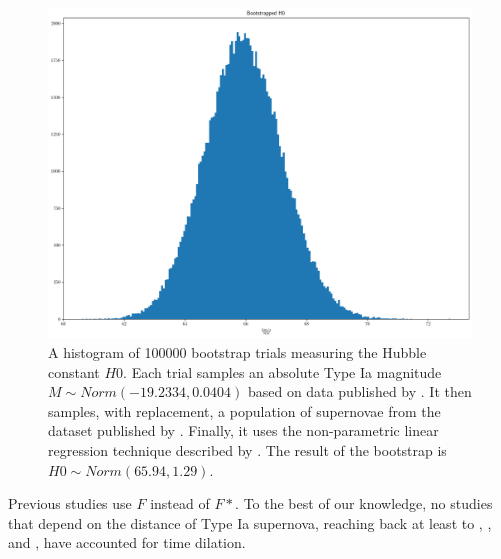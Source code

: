 \documentclass{article}
\begin{document}
\begin{figure}[ht]
  \includegraphics[width=\linewidth]{bootstrapped_H0.png}
  \caption{A histogram of 100000 bootstrap trials measuring the Hubble constant
  $H0$. Each trial samples an absolute Type Ia magnitude $M \sim Norm(-19.2334,
  0.0404)$ based on data published by \citet{camarena2020}. It then samples,
  with replacement, a population of supernovae from the dataset published by
  \citet{abbott2024}. Finally, it uses the non-parametric linear regression
  technique described by \citet{siegel1982}. The result of the bootstrap is $H0
  \sim Norm(65.94, 1.29)$.
  }
\end{figure}

Previous studies use $F$ instead of $F*$. To the best of our knowledge, no
studies that depend on the distance of Type Ia supernova, reaching back at
least to \citet{kim1996}, \citet{riess1998}, and \citet{perlmutter1999}, have
accounted for time dilation.



\end{document}
